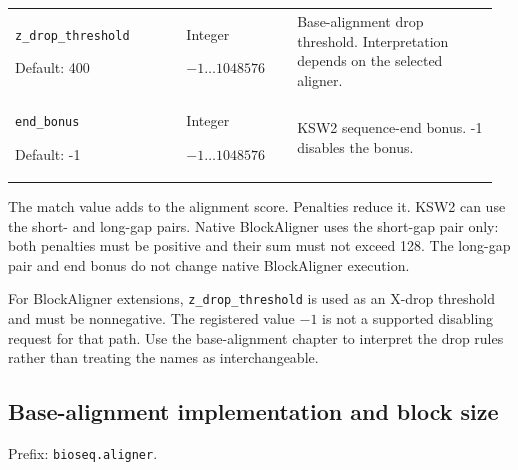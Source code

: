 \begin{longtable}{@{}>{\raggedright\arraybackslash}p{0.34\linewidth}>{\raggedright\arraybackslash}p{0.22\linewidth}>{\raggedright\arraybackslash}p{0.40\linewidth}@{}}
\nolinkurl{z_drop_threshold}\par Default: 400 & Integer\par $-1\ldots 1048576$ & Base-alignment drop threshold. Interpretation depends on the selected aligner. \\[4pt]
\nolinkurl{end_bonus}\par Default: -1 & Integer\par $-1\ldots 1048576$ & KSW2 sequence-end bonus. -1 disables the bonus. \\[4pt]
\end{longtable}
\endgroup

The match value adds to the alignment score. Penalties reduce it. KSW2 can use
the short- and long-gap pairs. Native BlockAligner uses the short-gap pair only:
both penalties must be positive and their sum must not exceed 128. The long-gap
pair and end bonus do not change native BlockAligner execution.

For BlockAligner extensions, \texttt{z\_drop\_threshold} is used as an X-drop
threshold and must be nonnegative. The registered value $-1$ is not a supported
disabling request for that path. Use the base-alignment chapter to interpret
the drop rules rather than treating the names as interchangeable.

\subsection{Base-alignment implementation and block size}

Prefix: \nolinkurl{bioseq.aligner}.


